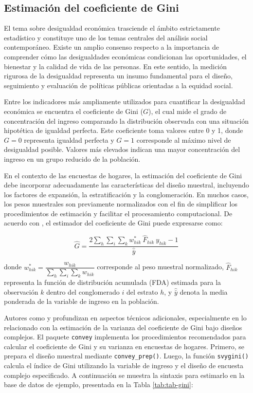 \documentclass[
  spanish,
  12pt,
]{book}
\begin{document}
\subsection{Estimación del coeficiente de Gini}\label{estimacion-del-coeficiente-de-gini}

El tema sobre desigualdad económica trasciende el ámbito estrictamente estadístico y constituye uno de los temas centrales del análisis social contemporáneo. Existe un amplio consenso respecto a la importancia de comprender cómo las desigualdades económicas condicionan las oportunidades, el bienestar y la calidad de vida de las personas. En este sentido, la medición rigurosa de la desigualdad representa un insumo fundamental para el diseño, seguimiento y evaluación de políticas públicas orientadas a la equidad social.

Entre los indicadores más ampliamente utilizados para cuantificar la desigualdad económica se encuentra el coeficiente de Gini (\(G\)), el cual mide el grado de concentración del ingreso comparando la distribución observada con una situación hipotética de igualdad perfecta. Este coeficiente toma valores entre 0 y 1, donde \(G = 0\) representa igualdad perfecta y \(G = 1\) corresponde al máximo nivel de desigualdad posible. Valores más elevados indican una mayor concentración del ingreso en un grupo reducido de la población.

En el contexto de las encuestas de hogares, la estimación del coeficiente de Gini debe incorporar adecuadamente las características del diseño muestral, incluyendo los factores de expansión, la estratificación y la conglomeración. En muchos casos, los pesos muestrales son previamente normalizados con el fin de simplificar los procedimientos de estimación y facilitar el procesamiento computacional. De acuerdo con \citet{binder1995}, el estimador del coeficiente de Gini puede expresarse como:

\[
\hat{G} = \frac{2\sum_{h}\sum_{i}\sum_{k}w_{hik}^{*}
\ \hat{F}_{hik} \ y_{hik}-1}{\hat{\bar{y}}}
\]

donde \(w_{hik}^{*}=\dfrac{w_{hik}}{\sum_{h}\sum_{i}\sum_{k}w_{hik}}\) corresponde al peso muestral normalizado, \(\hat{F}_{hik}\) representa la función de distribución acumulada (FDA) estimada para la observación \(k\) dentro del conglomerado \(i\) del estrato \(h\), y \(\hat{\bar{y}}\) denota la media ponderada de la variable de ingreso en la población.

Autores como \citet{osier2009variance} y \citet{langel2013variance} profundizan en aspectos técnicos adicionales, especialmente en lo relacionado con la estimación de la varianza del coeficiente de Gini bajo diseños complejos. El paquete \texttt{convey} \citep{convey2024} implementa los procedimientos recomendados para calcular el coeficiente de Gini y su varianza en encuestas de hogares. Primero, se prepara el diseño muestral mediante \texttt{convey\_prep()}. Luego, la función \texttt{svygini()} calcula el índice de Gini utilizando la variable de ingreso y el diseño de encuesta complejo especificado. A continuación se muestra la sintaxis para estimarlo en la base de datos de ejemplo, presentada en la Tabla \ref{tab:tab-gini}:
\end{document}
